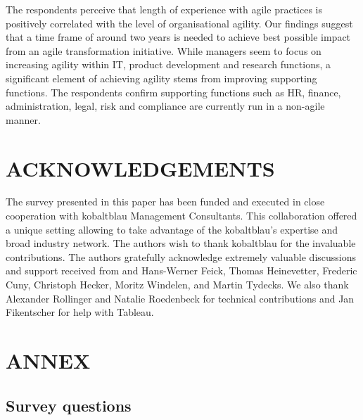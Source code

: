 \documentclass{article}
\begin{document}
The respondents perceive that length of experience with agile practices is positively correlated with the level of organisational agility. Our findings suggest that a time frame of around two years is needed to achieve best possible impact from an agile transformation initiative. While managers seem to focus on increasing agility within IT, product development and research functions, a significant element of achieving agility stems from improving supporting functions. The respondents confirm supporting functions such as HR, finance, administration, legal, risk and compliance are currently run in a non-agile manner.





\section{ACKNOWLEDGEMENTS}

The survey presented in this paper has been funded and executed in close cooperation with kobaltblau Management Consultants. This collaboration offered a unique setting allowing to take advantage of the kobaltblau's expertise and broad industry network. The authors wish to thank kobaltblau for the invaluable contributions. The authors gratefully acknowledge extremely valuable discussions and support received from and Hans-Werner Feick, Thomas Heinevetter, Frederic Cuny, Christoph Hecker, Moritz Windelen, and Martin Tydecks. We also thank Alexander Rollinger and Natalie Roedenbeck for technical contributions and Jan Fikentscher for help with Tableau.


\section{ANNEX}

\subsection{Survey questions}
\label{subsec:survey-questions}
\end{document}
